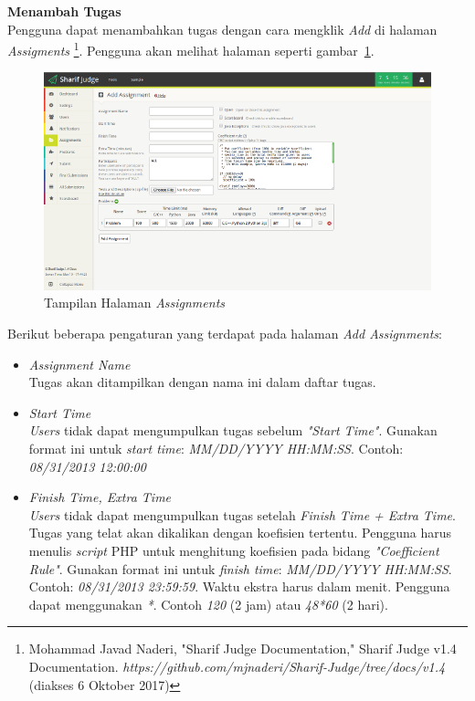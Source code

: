 \documentclass[a4paper,twoside]{article}
\begin{document}
\begin{enumerate}
\begin{enumerate}
			\textbf{Menambah Tugas} \\
			Pengguna dapat menambahkan tugas dengan cara mengklik \textit{Add} di halaman \textit{Assigments} \footnote{Mohammad Javad Naderi, "Sharif Judge Documentation," Sharif Judge v1.4 Documentation. \textit{https://github.com/mjnaderi/Sharif-Judge/tree/docs/v1.4} (diakses 6 Oktober 2017)}. Pengguna akan melihat halaman seperti gambar~\ref{fig:addass}.
			\begin{figure}[H]
				\centering  
				\includegraphics[scale=0.5]{add_assignment}  
				\caption[Tampilan Halaman \textit{Assignments}]{Tampilan Halaman \textit{Assignments}} 
				\label{fig:addass} 
			\end{figure} 
			
			Berikut beberapa pengaturan yang terdapat pada halaman \textit{Add Assignments}:
			\begin{itemize}
				\item \textit{Assignment Name} \\
				Tugas akan ditampilkan dengan nama ini dalam daftar tugas.
				
				\item \textit{Start Time} \\
				\textit{Users} tidak dapat mengumpulkan tugas sebelum \textit{"Start Time"}. Gunakan format ini untuk \textit{start time}: \textit{MM/DD/YYYY HH:MM:SS}. Contoh: \textit{08/31/2013 12:00:00}
				
				\item \textit{Finish Time, Extra Time}\\
				\textit{Users} tidak dapat mengumpulkan tugas setelah \textit{Finish Time + Extra Time}. Tugas yang telat akan dikalikan dengan koefisien tertentu. Pengguna harus menulis \textit{script} PHP untuk menghitung koefisien pada bidang \textit{"Coefficient Rule"}. Gunakan format ini untuk \textit{finish time}: \textit{MM/DD/YYYY HH:MM:SS}. Contoh: \textit{08/31/2013 23:59:59}. Waktu ekstra harus dalam menit. Pengguna dapat menggunakan \textit{*}. Contoh \textit{120} (2 jam) atau \textit{48*60} (2 hari).
				

\end{itemize}
\end{enumerate}
\end{enumerate}
\end{document}
